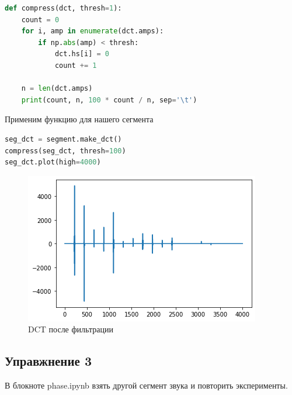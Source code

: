 \begin{lstlisting}[language=Python]
def compress(dct, thresh=1):
    count = 0
    for i, amp in enumerate(dct.amps):
        if np.abs(amp) < thresh:
            dct.hs[i] = 0
            count += 1
            
    n = len(dct.amps)
    print(count, n, 100 * count / n, sep='\t')
\end{lstlisting}

Применим функцию для нашего сегмента

\begin{lstlisting}[language=Python]
seg_dct = segment.make_dct()
compress(seg_dct, thresh=100)
seg_dct.plot(high=4000)
\end{lstlisting}
\begin{figure}[H]
	\begin{center}
		\includegraphics[scale=1]{fig/lab06/lab06_3.png}
		\caption{DCT после фильтрации}
	\end{center}
\end{figure}


\subsection{Управжнение 3}

В блокноте phase.ipynb взять другой сегмент звука и повторить эксперименты.

